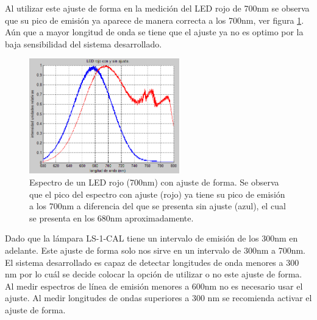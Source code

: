 Al utilizar este ajuste de forma en la medición del LED rojo de 700nm se observa que su pico de emisión ya aparece de manera correcta a los 700nm, ver figura \ref{fig:ledrojoa}. Aún que a mayor longitud de onda se tiene que el ajuste ya no es optimo por la baja sensibilidad del sistema desarrollado. 
\begin{figure}[h]
	\centering
	\includegraphics[width=0.8\linewidth,height=5cm]{Imagenes/4/LEDrojoA}
	\caption[Espectro de un LED rojo (700nm) con ajuste de forma.]{Espectro de un LED rojo (700nm) con ajuste de forma. Se observa que el pico del espectro con ajuste (rojo) ya tiene su pico de emisión a los 700nm a diferencia del que se presenta sin ajuste (azul), el cual se presenta en los 680nm aproximadamente.}
	\label{fig:ledrojoa}
\end{figure}

Dado que la lámpara LS-1-CAL tiene un intervalo de emisión de los 300nm en adelante. Este ajuste de forma solo nos sirve en un intervalo de 300nm a 700nm. El sistema desarrollado es capaz de detectar longitudes de onda menores a 300 nm por lo cuál se decide colocar la opción de utilizar o no este ajuste de forma. Al medir espectros de línea de emisión menores a 600nm no es necesario usar el ajuste. Al medir longitudes de ondas superiores a 300 nm se recomienda activar el ajuste de forma.



 
